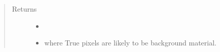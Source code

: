 \documentclass[letterpaper,10pt,english]{sphinxmanual}
\begin{document}
\begin{fulllineitems}
\begin{quote}
\begin{description}
\item[{Returns}] \leavevmode
\begin{itemize}
\item {} 

\item {} 
 where True pixels are likely to be background material.

\end{itemize}


\end{description}\end{quote}

\end{fulllineitems}

\end{document}
